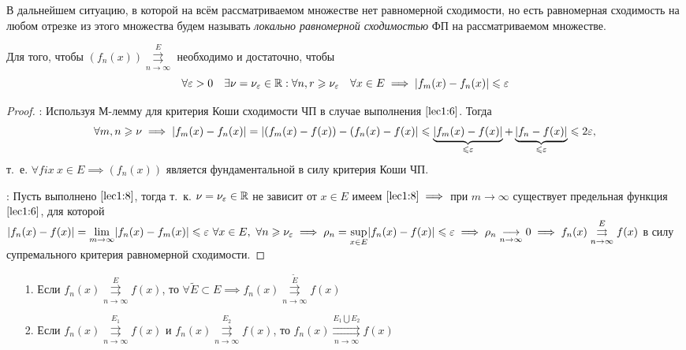 \documentclass[../../main.tex]{subfiles}
\begin{document}
В дальнейшем ситуацию, в которой на всём рассматриваемом 
множестве нет равномерной сходимости, но есть равномерная 
сходимость на любом отрезке из этого множества будем называть 
\emph{локально равномерной сходимостью} ФП на рассматриваемом множестве.

\begin{thm}
Для того, чтобы $(f_n(x)) \overset{E}
{\underset{n \to \infty}\rightrightarrows}$ необходимо и достаточно, 
чтобы 
\begin{equation}
\label{lec1:8}
\forall \varepsilon > 0 \quad \exists \nu=\nu_\varepsilon \in \mathbb{R} :
\forall n,r \geqslant \nu_\varepsilon \quad \forall x \in E \implies 
|f_m(x) - f_n(x)| \leqslant \varepsilon
\end{equation}
\end{thm}	

\begin{proof}
\;

\nec: Используя М-лемму для критерия Коши сходимости ЧП 
в случае выполнения $\eqref{lec1:6}$. Тогда
\[\forall m, n \geqslant \nu \implies |f_m(x) - f_n(x)| = 
|(f_m(x) - f(x)) - (f_n(x) - f(x)| \leqslant 
\underbrace{|f_m(x) - f(x)|}_{\leqslant \varepsilon} + 
\underbrace{|f_n - f(x)|}_{\leqslant \varepsilon} \leqslant  2\varepsilon,\] т.~е. 
$\forall fix \ x \in E \implies (f_n(x))$ 
является фундаментальной в силу критерия Коши ЧП.

\suff: Пусть выполнено $\eqref{lec1:8}$, тогда т.~к. $\nu=\nu_\varepsilon \in \mathbb{R}$
не зависит от $x \in E$ имеем $\eqref{lec1:8} \implies$ при $m \to \infty$ 
существует предельная функция 
$\eqref{lec1:6}$, для которой $|f_n(x) - f(x)| = 
\underset{m \to \infty}{\lim} |f_n(x) - f_m(x)| \leq  \eps \ 
\forall x \in E,\ \forall n \geq \nu_\eps \implies \rho_n = 
\underset{x \in E}{\sup} |f_n(x) - f(x)| \leq \eps \implies 
\rho_n \underset{n \to \infty}{\longrightarrow} 0 \implies
f_n(x) \overset{E}
{\underset{n \to \infty}\rightrightarrows} f(x)$
в силу супремального критерия равномерной сходимости. 
\end{proof}	

\begin{rem}
	\;
	\begin{itemize}
		\item[1.] Если $f_n(x) \overset{E}
{\underset{n \to \infty}\rightrightarrows} f(x)$, то 
$\forall \widetilde{E} \subset E \implies f_n(x) \overset{\widetilde{E}}
{\underset{n \to \infty}\rightrightarrows} f(x)$
		\item[2.] Если $f_n(x) \overset{E_1}
		{\underset{n \to \infty}\rightrightarrows} f(x)$ и 
		$f_n(x) \overset{E_2}
		{\underset{n \to \infty}\rightrightarrows} f(x)$, то
		$f_n(x) \overset{E_1 \bigcup E_2}
		{\underset{n \to \infty}\rightrightarrows} f(x)$
	\end{itemize}
\end{rem}	
\end{document}
